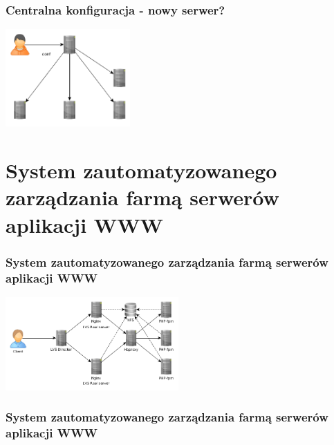 \documentclass[12pt]{beamer}
\begin{document}
\begin{frame}
\frametitle{Centralna konfiguracja - nowy serwer?}
\begin{center}
\includegraphics[width=180px]{img/zarzadzanie5.png}
\end{center}
\end{frame}

\section[SZZ]{System zautomatyzowanego zarządzania farmą serwerów aplikacji WWW}
\begin{frame}
\frametitle{System zautomatyzowanego zarządzania farmą serwerów aplikacji WWW}
\begin{center}
\includegraphics[width=250px]{img/struktura_szz.png}
\end{center}
\end{frame}
\begin{frame}
\frametitle{System zautomatyzowanego zarządzania farmą serwerów aplikacji WWW}
\end{frame}
\frame{\titlepage}
\end{document}
